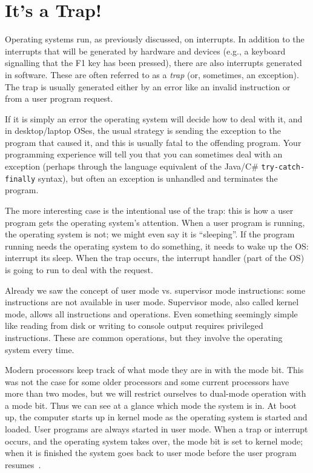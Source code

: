 \section*{It's a Trap!}
Operating systems run, as previously discussed, on interrupts. In addition to the interrupts that will be generated by hardware and devices (e.g., a keyboard signalling that the F1 key has been pressed), there are also interrupts generated in software. These are often referred to as a \textit{trap} (or, sometimes, an exception). The trap is usually generated either by an error like an invalid instruction or from a user program request.

If it is simply an error the operating system will decide how to deal with it, and in desktop/laptop OSes, the usual strategy is sending the exception to the program that caused it, and this is usually fatal to the offending program. Your programming experience will tell you that you can sometimes deal with an exception (perhaps through the language equivalent of the Java/C\# \texttt{try-catch-finally} syntax), but often an exception is unhandled and terminates the program.

The more interesting case is the intentional use of the trap: this is how a user program gets the operating system's attention. When a user program is running, the operating system is not; we might even say it is ``sleeping''. If the program running needs the operating system to do something, it needs to wake up the OS: interrupt its sleep. When the trap occurs, the interrupt handler (part of the OS) is going to run to deal with the request.

Already we saw the concept of user mode vs. supervisor mode instructions: some instructions are not available in user mode. Supervisor mode, also called kernel mode, allows all instructions and operations. Even something seemingly simple like reading from disk or writing to console output requires privileged instructions. These are common operations, but they involve the operating system every time.

Modern processors keep track of what mode they are in with the mode bit. This was not the case for some older processors and some current processors have more than two modes, but we will restrict ourselves to dual-mode operation with a mode bit. Thus we can see at a glance which mode the system is in. At boot up, the computer starts up in kernel mode as the operating system is started and loaded. User programs are always started in user mode. When a trap or interrupt occurs, and the operating system takes over, the mode bit is set to kernel mode; when it is finished the system goes back to user mode before the user program resumes~\cite{osc}.

